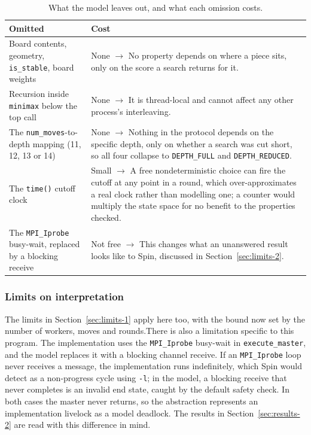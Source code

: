 \documentclass[10pt,a4paper]{article}
\newcommand{\code}[1]{\texttt{#1}}
\begin{document}
\begin{table}[htbp]
\centering
\caption{What the model leaves out, and what each omission costs.}
\label{tab:omissions2}
\begin{tabular}{p{4.4cm} p{9.6cm}}
\toprule
\textbf{Omitted} & \textbf{Cost} \\
\midrule
Board contents, geometry, \code{is\_stable}, board weights &
None $\rightarrow$ No property depends on where a piece sits, only on the score a search returns for it. \\
\addlinespace
Recursion inside \code{minimax} below the top call &
None $\rightarrow$ It is thread-local and cannot affect any other process's
interleaving. \\
\addlinespace
The \code{num\_moves}-to-depth mapping (11, 12, 13 or 14) &
None $\rightarrow$ Nothing in the protocol depends on the specific depth, only on
whether a search was cut short, so all four collapse to
\code{DEPTH\_FULL} and \code{DEPTH\_REDUCED}. \\
\addlinespace
The \code{time()} cutoff clock &
Small $\rightarrow$ A free nondeterministic choice can fire the cutoff at any point in
a round, which over-approximates a real clock rather than modelling one;
a counter would multiply the state space for no benefit to the properties
checked. \\
\addlinespace
The \code{MPI\_Iprobe} busy-wait, replaced by a blocking receive &
Not free $\rightarrow$ This changes what an unanswered result looks like to Spin,
discussed in Section~\ref{sec:limits-2}. \\
\bottomrule
\end{tabular}
\end{table}

\subsubsection*{Limits on interpretation}
\label{sec:limits-2}

The limits in Section~\ref{sec:limits-1} apply here too, with the bound now
set by the number of workers, moves and rounds.There is also a limitation specific to this program. The implementation uses
the \code{MPI\_Iprobe} busy-wait in \code{execute\_master}, and the model
replaces it with a blocking channel receive. If an \code{MPI\_Iprobe} loop
never receives a message, the implementation runs indefinitely, which Spin
would detect as a non-progress cycle using \code{-l}; in the model, a blocking
receive that never completes is an invalid end state, caught by the default
safety check. In both cases the master never returns, so the abstraction
represents an implementation livelock as a model deadlock. The results in
Section~\ref{sec:results-2} are read with this difference in mind.
\end{document}
